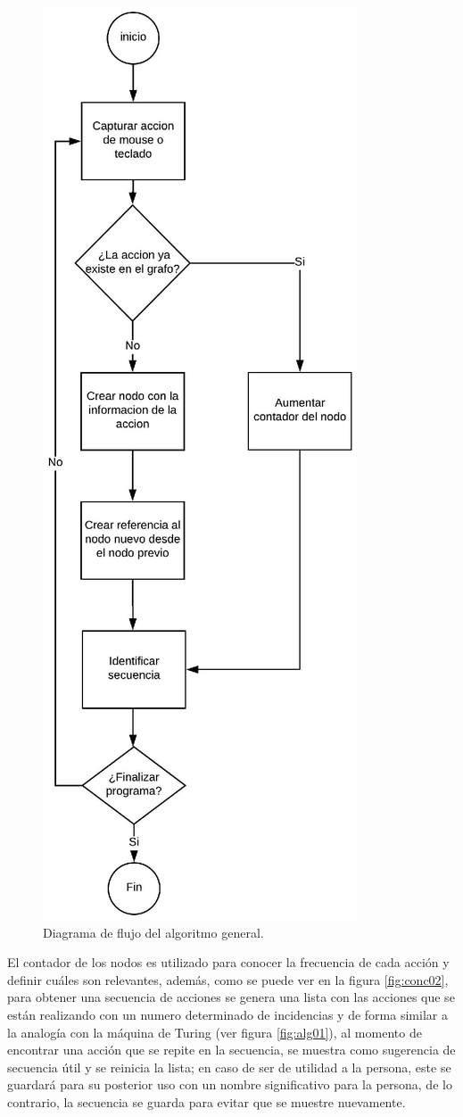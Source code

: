 \begin{figure}[]
\centering
\includegraphics[width=0.5\columnwidth]{chap4/Imagenes/concepto1.eps}
\caption{Diagrama de flujo del algoritmo general.}
\label{fig:conc01}
\end{figure} 

El contador de los nodos es utilizado para conocer la frecuencia de cada 
 acci\'on y definir cu\'ales son relevantes, adem\'as, como se puede ver 
 en la figura \ref{fig:conc02}, para obtener una secuencia de acciones se
 genera una lista con las acciones que se est\'an realizando con un numero 
 determinado de incidencias y de forma similar a la analog\'ia con la m\'aquina
 de Turing (ver figura \ref{fig:alg01}), al momento de encontrar una acci\'on
 que se repite en la secuencia,
 se muestra como sugerencia de secuencia \'util y se reinicia la lista; en 
 caso de ser de utilidad a la persona, este se guardar\'a para su posterior 
 uso con un nombre significativo para la persona, de lo contrario, la 
 secuencia se guarda para evitar que se muestre nuevamente.


